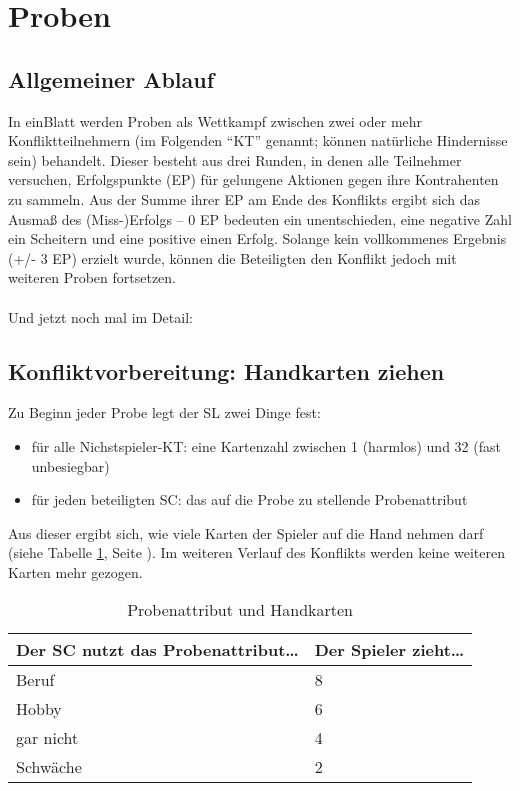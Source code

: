 \section {Proben}
\subsection {Allgemeiner Ablauf}
In einBlatt werden Proben als Wettkampf zwischen zwei oder mehr Konfliktteilnehmern (im Folgenden "`KT"' genannt; können natürliche Hindernisse sein) behandelt. Dieser besteht aus drei Runden, in denen alle Teilnehmer versuchen, Erfolgspunkte (EP) für gelungene Aktionen gegen ihre Kontrahenten zu sammeln. Aus der Summe ihrer EP am Ende des Konflikts ergibt sich das Ausmaß des (Miss-)Erfolgs -- 0 EP bedeuten ein unentschieden, eine negative Zahl ein Scheitern und eine positive einen Erfolg. Solange kein vollkommenes Ergebnis (+/- 3 EP) erzielt wurde, können die Beteiligten den Konflikt jedoch mit weiteren Proben fortsetzen.
\\
\\
Und jetzt noch mal im Detail:
\subsection {Konfliktvorbereitung: Handkarten ziehen}
Zu Beginn jeder Probe legt der SL zwei Dinge fest:
\begin{itemize}
\item für alle Nichstspieler-KT: eine Kartenzahl zwischen 1 (harmlos) und 32 (fast unbesiegbar)
\item für jeden beteiligten SC: das auf die Probe zu stellende Probenattribut
\end{itemize}
Aus dieser ergibt sich, wie viele Karten der Spieler auf die Hand nehmen darf (siehe Tabelle \ref {tab:probenattributundhandkarten}, Seite \pageref {tab:probenattributundhandkarten}). Im weiteren Verlauf des Konflikts werden keine weiteren Karten mehr gezogen.

\begin{table}[H]
\caption{Probenattribut und Handkarten}
\label{tab:probenattributundhandkarten}
\begin{tabular}{|l|l|}
\hline
Der SC nutzt das Probenattribut\dots & Der Spieler zieht\dots \\
\hline
Beruf & 8 \\
Hobby & 6 \\
gar nicht & 4 \\
Schwäche & 2 \\
\hline
\end{tabular}
\end{table}

